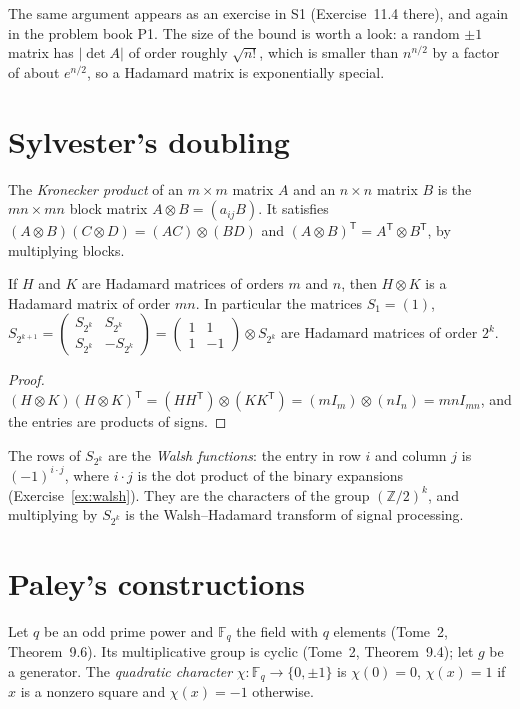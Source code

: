 The same argument appears as an exercise in S1 (Exercise~11.4 there), and again in the problem book P1. The
size of the bound is worth a look: a random $\pm1$ matrix has $|\det A|$ of order roughly $\sqrt{n!}$, which is smaller than $n^{n/2}$ by a factor
of about $e^{n/2}$, so a Hadamard matrix is exponentially special.

\section{Sylvester's doubling}

The \emph{Kronecker product} of an $m\times m$ matrix $A$ and an $n\times n$ matrix $B$ is the $mn\times mn$ block matrix $A\otimes B=(a_{ij}B)$. It
satisfies $(A\otimes B)(C\otimes D)=(AC)\otimes(BD)$ and $(A\otimes B)^{\mathsf T}=A^{\mathsf T}\otimes B^{\mathsf T}$, by multiplying blocks.

\begin{proposition}[Sylvester, 1867]\label{prop:kron}
If $H$ and $K$ are Hadamard matrices of orders $m$ and $n$, then $H\otimes K$ is a Hadamard matrix of order $mn$. In particular the matrices
$S_1=(1)$, $S_{2^{k+1}}=\begin{pmatrix}S_{2^k}&S_{2^k}\\S_{2^k}&-S_{2^k}\end{pmatrix}=\begin{pmatrix}1&1\\1&-1\end{pmatrix}\otimes S_{2^k}$ are
Hadamard matrices of order $2^k$.
\end{proposition}
\begin{proof}
$(H\otimes K)(H\otimes K)^{\mathsf T}=(HH^{\mathsf T})\otimes(KK^{\mathsf T})=(mI_m)\otimes(nI_n)=mnI_{mn}$, and the entries are products of signs.
\end{proof}

The rows of $S_{2^k}$ are the \emph{Walsh functions}: the entry in row $i$ and column $j$ is $(-1)^{i\cdot j}$, where $i\cdot j$ is the dot product of
the binary expansions (Exercise~\ref{ex:walsh}). They are the characters of the group $(\mathbb Z/2)^k$, and multiplying by $S_{2^k}$ is the
Walsh--Hadamard transform of signal processing.

\section{Paley's constructions}

Let $q$ be an odd prime power and $\mathbb F_q$ the field with $q$ elements (Tome~2, Theorem~9.6). Its multiplicative group is cyclic (Tome~2,
Theorem~9.4); let $g$ be a generator. The \emph{quadratic character} $\chi:\mathbb F_q\to\{0,\pm1\}$ is $\chi(0)=0$, $\chi(x)=1$ if $x$ is a nonzero
square and $\chi(x)=-1$ otherwise.

